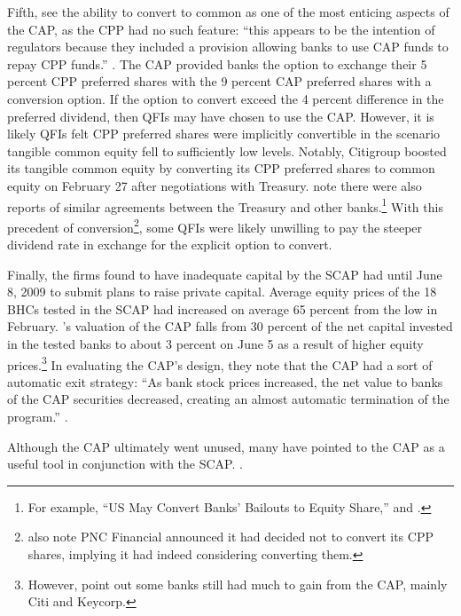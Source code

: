 \documentclass[12pt]{article}
\begin{document}
Fifth, \citet{GW} see the ability to convert to common as one of the most enticing aspects of the CAP, as the CPP had no such feature: ``this appears to be the intention of regulators because they included a provision allowing banks to use CAP funds to repay CPP funds.'' \citep{GW}. The CAP provided banks the option to exchange their 5 percent CPP preferred shares with the 9 percent CAP preferred shares with a conversion option. If the option to convert exceed the 4 percent difference in the preferred dividend, then QFIs may have chosen to use the CAP. However, it is likely QFIs felt CPP preferred shares were implicitly convertible in the scenario tangible common equity fell to sufficiently low levels. Notably, Citigroup boosted its tangible common equity by converting its CPP preferred shares to common equity on February 27 after negotiations with Treasury. \citet{GW} note there were also reports of similar agreements between the Treasury and other banks.\footnote{For example, ``US May Convert Banks' Bailouts to Equity Share,'' \citep{Andrews} and \citep{GW}.} With this precedent of conversion\footnote{\citet{GW} also note PNC Financial announced it had decided not to convert its CPP shares, implying it had indeed considering converting them.}, some QFIs were likely unwilling to pay the steeper dividend rate in exchange for the explicit option to convert.

Finally, the firms found to have inadequate capital by the SCAP had until June 8, 2009 to submit plans to raise private capital. Average equity prices of the 18 BHCs tested in the SCAP had increased on average 65 percent from the low in February. \citet{GW}'s valuation of the CAP falls from 30 percent of the net capital invested in the tested banks to about 3 percent on June 5 as a result of higher equity prices.\footnote{However, \citet{GW} point out some banks still had much to gain from the CAP, mainly Citi and Keycorp.} In evaluating the CAP's design, they note that the CAP had a sort of automatic exit strategy: ``As bank stock prices increased, the net value to banks of the CAP securities decreased, creating an almost automatic termination of the program.'' \citep{GW}.

Although the CAP ultimately went unused, many have pointed to the CAP as a useful tool in conjunction with the SCAP. \citep{Bernanke}.

\newpage
{}


\nocite{*}

\end{document}

